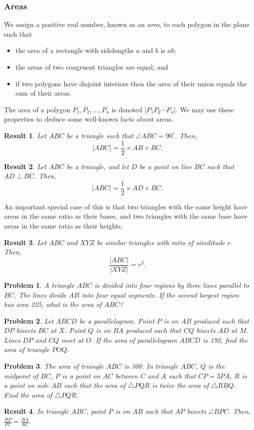 \documentclass{amsart}
\newtheorem{problem}{Problem}[subsubsection]
\newtheorem{result}{Result}[subsubsection]
\begin{document}
\subsubsection{Areas}
We assign a positive real number, known as an \emph{area}, to each polygon in
the plane such that
\begin{itemize}
  \item the area of a rectangle with sidelengths $a$ and $b$ is $ab$;
  \item the areas of two congruent triangles are equal; and
  \item if two polygons have disjoint interiors then the area of their union
    equals the sum of their areas.
\end{itemize}
The area of a polygon $P_1,P_2,\ldots,P_n$ is denoted $|P_1P_2\cdots P_n|$. We
may use these properties to deduce some well-known facts about areas.
\begin{result}{\label{r:b:g:a:1}}
  Let $ABC$ be a triangle such that $\angle ABC=90^\circ$. Then,
  \[|ABC|=\frac 12\times AB\times BC.\]
\end{result}
\begin{result}{\label{r:b:g:a:2}}
  Let $ABC$ be a triangle, and let $D$ be a point on line $BC$ such that
  $AD\perp BC$. Then,
  \[|ABC|=\frac 12\times AD\times BC.\]
\end{result}
An important special case of this is that two triangles with the same height
have areas in the same ratio as their bases, and two triangles with the same
base have areas in the same ratio as their heights.
\begin{result}{\label{r:b:g:a:3}}
  Let $ABC$ and $XYZ$ be similar triangles with ratio of similitude $r$. Then,
  \[\frac{|ABC|}{|XYZ|}=r^2.\]
\end{result}
\begin{problem}{\label{p:b:g:a:1}}
  A triangle $ABC$ is divided into four regions by three lines parallel to $BC$.
  The lines divide $AB$ into four equal segments. If the second largest region
  has area 225, what is the area of $ABC$?
\end{problem}
\begin{problem}{\label{p:b:g:a:2}}
  Let $ABCD$ be a parallelogram. Point $P$ is on $AB$ produced such that $DP$
  bisects $BC$ at $X$. Point $Q$ is on $BA$ produced such that $CQ$ bisects $AD$
  at $M$. Lines $DP$ and $CQ$ meet at $O$. If the area of parallelogram $ABCD$
  is 192, find the area of triangle $POQ$.
\end{problem}
\begin{problem}{\label{p:b:g:a:3}}
  The area of triangle $ABC$ is 300. In triangle $ABC$, $Q$ is the midpoint of
  $BC$, $P$ is a point on $AC$ between $C$ and $A$ such that $CP=3PA$, $R$ is a
  point on side $AB$ such that the area of $\triangle PQR$ is twice the area of
  $\triangle RBQ$. Find the area of $\triangle PQR$.
\end{problem}
\begin{result}{\label{r:b:g:a:4}}
  In triangle $ABC$, point $P$ is on $AB$ such that $AP$ bisects $\angle BPC$.
  Then, $\frac{BP}{PC}=\frac{BA}{AC}$.
\end{result}
\end{document}
